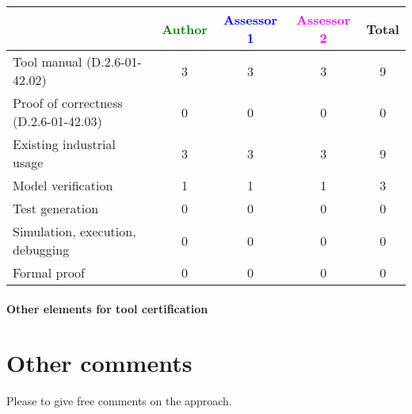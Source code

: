 \begin{tabular}{|l | c | c | c | c|}
\hline
& \textcolor{green}{Author} & \textcolor{blue}{Assessor 1} & \textcolor{magenta}{Assessor 2} & Total \\
\hline 
Tool manual (D.2.6-01-42.02) &3 &3 & 3& 9 \\
\hline
Proof of correctness (D.2.6-01-42.03)   &0 &0 & 0& 0 \\
\hline
Existing industrial  usage  &3 &3 & 3& 9 \\
\hline
Model verification &1 &1 & 1& 3 \\
\hline
Test generation &0 &0 & 0& 0 \\
\hline
Simulation, execution, debugging &0 &0 & 0& 0 \\
\hline
Formal proof &0 &0 & 0& 0 \\
\hline
\end{tabular}

\paragraph{Other elements for tool certification}

\section{Other comments}
Please to  give free comments on the approach.




